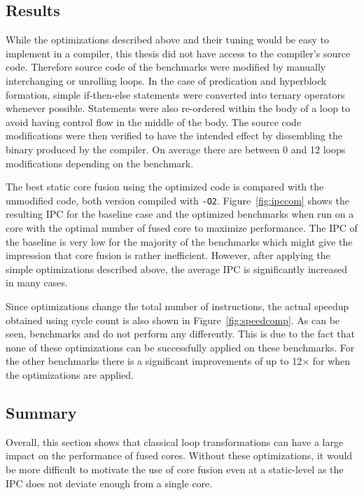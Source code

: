 \vspace{5mm}
\subsection{Results}

While the optimizations described above and their tuning would be easy to implement in a compiler, this thesis did not have access to the compiler's source code.
Therefore source code of the benchmarks were modified by manually interchanging or unrolling loops.
In the case of predication and hyperblock formation, simple if-then-else statements were converted into ternary operators whenever possible.
Statements were also re-ordered within the body of a loop to avoid having control flow in the middle of the body.
The source code modifications were then verified to have the intended effect by dissembling the binary produced by the compiler.
On average there are between 0 and 12 loops modifications depending on the benchmark.

The best static core fusion using the optimized code is compared with the unmodified code, both version compiled with \texttt{-O2}.
Figure~\ref{fig:ipccom} shows the resulting IPC for the baseline case and the optimized benchmarks when run on a core with the optimal number of fused core to maximize performance.
The IPC of the baseline is very low for the majority of the benchmarks which might give the impression that core fusion is rather inefficient.
However, after applying the simple optimizations described above, the average IPC is significantly increased in many cases.

Since optimizations change the total number of instructions, the actual speedup obtained using cycle count is also shown in Figure~\ref{fig:speedcomp}.
As can be seen, benchmarks  and  do not perform any differently.
This is due to the fact that none of these optimizations can be successfully applied on these benchmarks.
For the other benchmarks there is a significant improvements of up to 12$\times$ for  when the optimizations are applied.

\subsection{Summary}

Overall, this section shows that classical loop transformations can have a large impact on the performance of fused cores.
Without these optimizations, it would be more difficult to motivate the use of core fusion even at a static-level as the IPC does not deviate enough from a single core.
